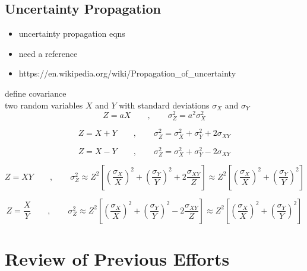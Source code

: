 \subsection{Uncertainty Propagation}
\label{subsec:chap3-uncertainty-prop}

\begin{itemize}[noitemsep]
  \item uncertainty propagation eqns
  \item need a reference
  \item https://en.wikipedia.org/wiki/Propagation_of_uncertainty
\end{itemize}

define covariance\\
two random variables $X$ and $Y$ with standard deviations $\sigma_{X}$ and $\sigma_{Y}$\\

\begin{equation}
Z = aX \qquad,\qquad \sigma_{Z}^{2} = a^{2}\sigma_{X}^{2}
\end{equation}

\begin{equation}
Z = X + Y \qquad,\qquad \sigma_{Z}^{2} = \sigma_{X}^{2} + \sigma_{Y}^{2} + 2\sigma_{XY}
\end{equation}

\begin{equation}
Z = X - Y \qquad,\qquad \sigma_{Z}^{2} = \sigma_{X}^{2} + \sigma_{Y}^{2} - 2\sigma_{XY}
\end{equation}

\begin{equation}
Z = XY \qquad,\qquad \sigma_{Z}^{2} \approx Z^{2}\left[\left(\frac{\sigma_{X}}{X}\right)^{2} + \left(\frac{\sigma_{Y}}{Y}\right)^{2} + 2\frac{\sigma_{XY}}{Z}\right] \approx Z^{2}\left[\left(\frac{\sigma_{X}}{X}\right)^{2} + \left(\frac{\sigma_{Y}}{Y}\right)^{2}\right]
\end{equation}

\begin{equation}
Z = \frac{X}{Y} \qquad,\qquad \sigma_{Z}^{2} \approx Z^{2}\left[\left(\frac{\sigma_{X}}{X}\right)^{2} + \left(\frac{\sigma_{Y}}{Y}\right)^{2} - 2\frac{\sigma_{XY}}{Z}\right] \approx Z^{2}\left[\left(\frac{\sigma_{X}}{X}\right)^{2} + \left(\frac{\sigma_{Y}}{Y}\right)^{2}\right]
\end{equation}


\section{Review of Previous Efforts}
\label{sec:chap3-lit-review}

